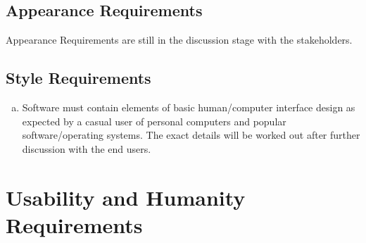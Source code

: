 \documentclass[paper=letter, fontsize=10pt]{scrartcl}
\numberwithin{equation}{section}		%
\numberwithin{figure}{section}			%
\numberwithin{table}{section}				%
\begin{document}
\subsection{Appearance Requirements}
Appearance Requirements are still in the discussion stage with the stakeholders.
\subsection{Style Requirements}
\begin{enumerate}[(a)]
	\item Software must contain elements of basic human/computer interface design as expected by a casual user of personal computers and popular software/operating systems. The exact details will be worked out after further discussion with the end users.
\end{enumerate}

\section{Usability and Humanity Requirements}
\end{document}
